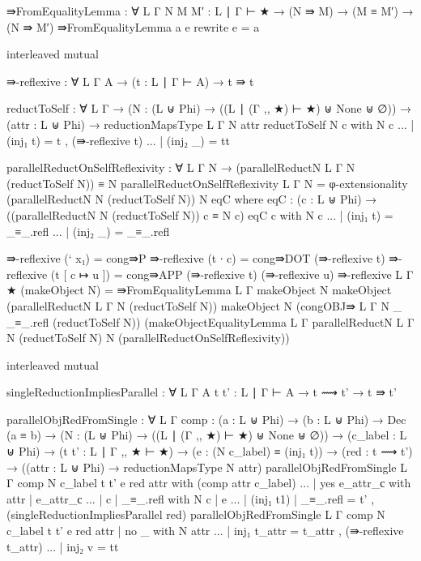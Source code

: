 {\begin{code}
⇛FromEqualityLemma : ∀ {L Γ} {N M M′ : L ∣ Γ ⊢ ★} → (N ⇛ M) → (M ≡ M′) → (N ⇛ M′)
⇛FromEqualityLemma a e rewrite e = a

interleaved mutual

  ⇛-reflexive : ∀ {L Γ A} → (t : L ∣ Γ ⊢ A) → t ⇛ t

  reductToSelf : ∀ {L Γ} → (N : (L ⊎ Phi) → ((L ∣ (Γ ,, ★) ⊢ ★) ⊎ None ⊎ ∅)) → (attr : L ⊎ Phi) → reductionMapsType {L} {Γ} N attr
  reductToSelf N c with N c
  ... | (inj₁ t) = t , (⇛-reflexive t)
  ... | (inj₂ _) = tt

  parallelReductOnSelfReflexivity : ∀ {L Γ N} → (parallelReductN {L} {Γ} N (reductToSelf N)) ≡ N
  parallelReductOnSelfReflexivity {L} {Γ} {N} = φ-extensionality (parallelReductN N (reductToSelf N)) N eqC where
    eqC : (c : L ⊎ Phi) → ((parallelReductN N (reductToSelf N)) c ≡ N c)
    eqC c with N c
    ... | (inj₁ t) = _≡_.refl
    ... | (inj₂ _) = _≡_.refl

  ⇛-reflexive (` x₁) = cong⇛P
  ⇛-reflexive (t ∙ c) = cong⇛DOT (⇛-reflexive t)
  ⇛-reflexive (t [ c ↦ u ]) = cong⇛APP (⇛-reflexive t) (⇛-reflexive u)
  ⇛-reflexive {L} {Γ} {★} (makeObject N) = 
    ⇛FromEqualityLemma {L} {Γ}
      {makeObject N}
      {makeObject (parallelReductN {L} {Γ} N (reductToSelf N))}
      {makeObject N}
      (congOBJ⇛ {L} {Γ} {N} {_} {_≡_.refl} (reductToSelf N))
      (makeObjectEqualityLemma {L} {Γ} {parallelReductN {L} {Γ} N (reductToSelf N)} {N} (parallelReductOnSelfReflexivity))

interleaved mutual

  singleReductionImpliesParallel : ∀ {L Γ A} {t t' : L ∣ Γ ⊢ A} → t ⟿ t' → t ⇛ t'

  parallelObjRedFromSingle : ∀ {L Γ} {comp : (a : L ⊎ Phi) → (b : L ⊎ Phi) → Dec (a ≡ b)}
    → (N : (L ⊎ Phi) → ((L ∣ (Γ ,, ★) ⊢ ★) ⊎ None ⊎ ∅)) 
    → (c_label : L ⊎ Phi) 
    → (t t' : L ∣ Γ ,, ★ ⊢ ★) 
    → (e : (N c_label) ≡ (inj₁ t)) 
    → (red : t ⟿ t') 
    → ((attr : L ⊎ Phi) → reductionMapsType N attr)
  parallelObjRedFromSingle {L} {Γ} {comp} N c_label t t' e red attr with (comp attr c_label)
  ... | yes e_attr_с with attr | e_attr_с
  ...   | c | _≡_.refl with N c | e
  ...     | (inj₁ t1) | _≡_.refl =  t' , (singleReductionImpliesParallel red)
  parallelObjRedFromSingle {L} {Γ} {comp} N c_label t t' e red attr
      | no _ with N attr
  ...   | inj₁ t_attr = t_attr , (⇛-reflexive t_attr)
  ...   | inj₂ v = tt


\end{code}}
